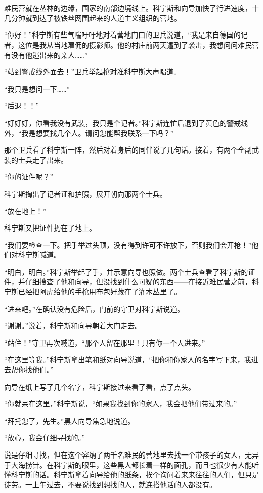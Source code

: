 \section*{}

难民营就在丛林的边缘，国家的南部边境线上。科宁斯和向导加快了行进速度，十几分钟就到达了被铁丝网围起来的人道主义组织的营地。

“你好！”科宁斯有些气喘吁吁地对着营地门口的卫兵说道，“我是来自德国的记者，这位是我从当地雇佣的摄影师。他的村庄前两天遭到了袭击，我想问问难民营有没有他逃出来的亲人……”

“站到警戒线外面去！”卫兵举起枪对准科宁斯大声喝道。

“我只是想问一下……”

“后退！！”

“好好好，你看我没有武装，我只是个记者。”科宁斯连忙后退到了黄色的警戒线外，“我是想要找几个人。请问您能帮我联系一下吗？”

那个卫兵看了科宁斯一阵，然后对着身后的同伴说了几句话。接着，有两个全副武装的士兵走了出来。

“你的证件呢？”

科宁斯掏出了记者证和护照，展开朝向那两个士兵。

“放在地上！”

科宁斯又把证件扔在了地上。

“我们要检查一下。把手举过头顶，没有得到许可不许放下，否则我们会开枪！”他们对科宁斯喊道。

“明白，明白。”科宁斯举起了手，并示意向导也照做。两个士兵查看了科宁斯的证件，并仔细搜查了他和向导，但没找到什么可疑的东西——在接近难民营之前，科宁斯已经把阿虎给他的手枪用布包好藏在了灌木丛里了。

“进来吧。”在确认没有危险后，门前的守卫对科宁斯说道。

“谢谢。”说着，科宁斯和向导朝着大门走去。

“站住！”守卫再次喊道，“那个人留在那里！只有你一个人进来。”

“在这里等我。”科宁斯拿出笔和纸对向导说道，“把你和你家人的名字写下来，我进去帮你找他们。”

向导在纸上写了几个名字，科宁斯接过来看了看，点了点头。

“你就呆在这里，”科宁斯说，“如果我找到你的家人，我会把他们带过来的。”

“拜托您了，先生。”黑人向导焦急地说道。

“放心，我会仔细寻找的。”

说是仔细寻找，但在这个容纳了两千名难民的营地里去找一个带孩子的女人，无异于大海捞针。在科宁斯的眼里，这些黑人都长着一样的面孔，而且也很少有人能听懂科宁斯的话。科宁斯拿着向导给他的纸条，挨个询问着来来往往的人们，但只是徒劳。一上午过去，不要说找到想找的人，就连搭他话的人都没有。

